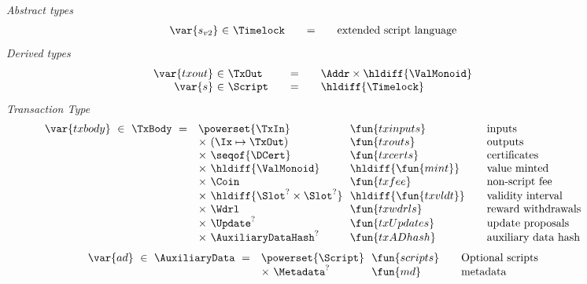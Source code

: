 \begin{figure*}[t!]
  \emph{Abstract types}
  \begin{equation*}
    \begin{array}{r@{~\in~}l@{\qquad=\qquad}lr}
      \var{s_{v2}} & \Timelock & \text{extended script language}
    \end{array}
  \end{equation*}
  \emph{Derived types}
  \begin{equation*}
    \begin{array}{r@{~\in~}l@{\qquad=\qquad}lr}
      \var{txout} & \TxOut & \Addr \times \hldiff{\ValMonoid} \\
      \var{s} & \Script & \hldiff{\Timelock}
      \\
    \end{array}
  \end{equation*}
  \emph{Transaction Type}
  \begin{equation*}
    \begin{array}{r@{~~}l@{~~}l@{\qquad}l}
      \var{txbody} ~\in~ \TxBody ~=~
      & \powerset{\TxIn} & \fun{txinputs}& \text{inputs}\\
      &\times ~(\Ix \mapsto \TxOut) & \fun{txouts}& \text{outputs}\\
      & \times~ \seqof{\DCert} & \fun{txcerts}& \text{certificates}\\
       & \times ~\hldiff{\ValMonoid}  & \hldiff{\fun{mint}} &\text{value minted}\\
       & \times ~\Coin & \fun{txfee} &\text{non-script fee}\\
       & \times ~\hldiff{\Slot^? \times \Slot^?} & \hldiff{\fun{txvldt}} & \text{validity interval}\\
       & \times~ \Wdrl  & \fun{txwdrls} &\text{reward withdrawals}\\
       & \times ~\Update^?  & \fun{txUpdates} & \text{update proposals}\\
       & \times ~\AuxiliaryDataHash^? & \fun{txADhash} & \text{auxiliary data hash}
    \end{array}
  \end{equation*}
  \begin{equation*}
    \begin{array}{r@{~~}l@{~~}l@{\qquad}l}
      \var{ad} ~\in~ \AuxiliaryData ~=~
      & \powerset{\Script} & \fun{scripts}& \text{Optional scripts}\\
      & \times ~\Metadata^? & \fun{md} & \text{metadata}

\end{array}
\end{equation*}
\end{figure*}
